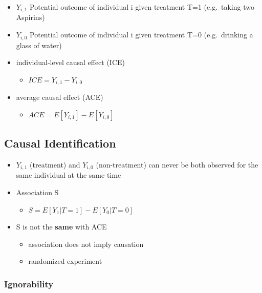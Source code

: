 \documentclass[]{book}
\providecommand{\tightlist}{%
  \setlength{\itemsep}{0pt}\setlength{\parskip}{0pt}}
\begin{document}
\begin{itemize}
\tightlist
\item
  \(Y_{i,1}\) Potential outcome of individual i given treatment T=1 (e.g.~taking two Aspirins)
\item
  \(Y_{i,0}\) Potential outcome of individual i given treatment T=0 (e.g.~drinking a glass of water)
\item
  individual-level causal effect (ICE)

  \begin{itemize}
  \tightlist
  \item
    \(ICE=Y_{i,1} −Y_{i,0}\)
  \end{itemize}
\item
  average causal effect (ACE)

  \begin{itemize}
  \tightlist
  \item
    \(ACE = E[Y_{i,1}] −E[Y_{i,0}]\)
  \end{itemize}
\end{itemize}

\hypertarget{causal-identification}{%
\subsection{Causal Identification}\label{causal-identification}}

\begin{itemize}
\tightlist
\item
  \(Y_{i,1}\) (treatment) and \(Y_{i,0}\) (non-treatment) can never be both observed for the same individual at the same time
\item
  Association S

  \begin{itemize}
  \tightlist
  \item
    \(S = E[Y_1|T = 1] - E[Y_0|T = 0]\)
  \end{itemize}
\item
  S is not the \textbf{same} with ACE

  \begin{itemize}
  \tightlist
  \item
    association does not imply causation
  \item
    randomized experiment
  \end{itemize}
\end{itemize}

\hypertarget{ignorability}{%
\subsubsection{Ignorability}\label{ignorability}}
\end{document}
